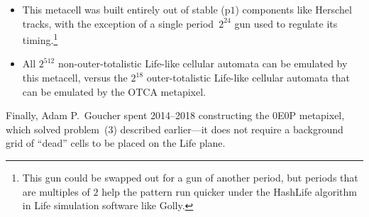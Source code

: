 \begin{itemize}
	\item This metacell was built entirely out of stable (p$1$) components like Herschel tracks, with the exception of a single period~$2^{24}$ gun used to regulate its timing.\footnote{This gun could be swapped out for a gun of another period, but periods that are multiples of $2$ help the pattern run quicker under the HashLife algorithm in Life simulation software like Golly.}\smallskip
	
	\item All $2^{512}$ non-outer-totalistic Life-like cellular automata can be emulated by this metacell, versus the $2^{18}$ outer-totalistic Life-like cellular automata that can be emulated by the OTCA metapixel.\smallskip%
\end{itemize}


Finally, Adam P.~Goucher spent 2014--2018 constructing the 0E0P metapixel, which solved problem~(3) described earlier---it does not require a background grid of ``dead'' cells to be placed on the Life plane.






